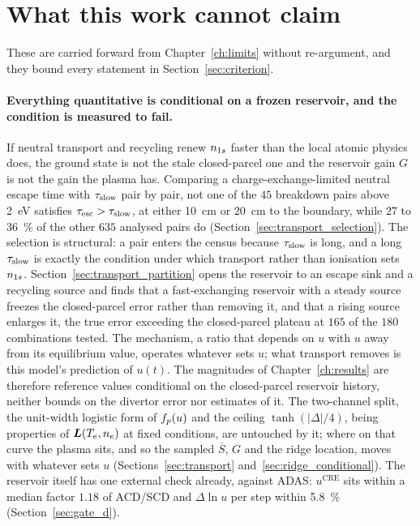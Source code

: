 \section{What this work cannot claim}
\label{sec:implications}

These are carried forward from Chapter~\ref{ch:limits} without re-argument, and
they bound every statement in Section~\ref{sec:criterion}.

\paragraph{Everything quantitative is conditional on a frozen reservoir, and the
condition is measured to fail.} If neutral transport and recycling renew $n_{1s}$
faster than the local atomic physics does, the ground state is not the stale
closed-parcel one and the reservoir gain $G$ is not the gain the plasma has.
Comparing a charge-exchange-limited neutral
escape time with $\tau_{\mathrm{slow}}$ pair by pair, not one of the $45$ breakdown pairs
above \SI{2}{\electronvolt} satisfies $\tau_{\mathrm{esc}} > \tau_{\mathrm{slow}}$, at either
\SI{10}{\centi\metre} or \SI{20}{\centi\metre} to the boundary, while $27$ to
\SI{36}{\percent} of the other $635$ analysed pairs do
(Section~\ref{sec:transport_selection}). The selection is structural: a pair
enters the census because $\tau_{\mathrm{slow}}$ is long, and a long $\tau_{\mathrm{slow}}$ is exactly the
condition under which transport rather than ionisation sets $n_{1s}$.
Section~\ref{sec:transport_partition} opens the reservoir to an
escape sink and a recycling source and finds that a fast-exchanging reservoir
with a steady source freezes the closed-parcel error rather than removing it,
and that a rising source enlarges it, the true error exceeding the
closed-parcel plateau at $165$ of the $180$ combinations tested. The mechanism,
a ratio that depends on $u$ with $u$ away from its equilibrium value, operates
whatever sets $u$; what transport removes is this model's prediction of $u(t)$.
The magnitudes of Chapter~\ref{ch:results} are therefore reference values
conditional on the closed-parcel reservoir history, neither bounds on the
divertor error nor estimates of it. The two-channel split, the
unit-width logistic form of $f_{p}(u)$ and the ceiling $\tanh(|\Delta|/4)$,
being properties of $\bm{L}(T_e,n_e)$ at fixed conditions, are untouched by
it; where on that curve the plasma sits, and so the sampled $\overline{S}$, $G$
and the ridge location, moves with whatever sets $u$
(Sections~\ref{sec:transport} and~\ref{sec:ridge_conditional}).
The reservoir itself has one external check already, against ADAS:
$u^{\mathrm{CRE}}$ sits within a median factor $1.18$ of ACD/SCD and
$\Delta\ln u$ per step within \SI{5.8}{\percent} (Section~\ref{sec:gate_d}).

